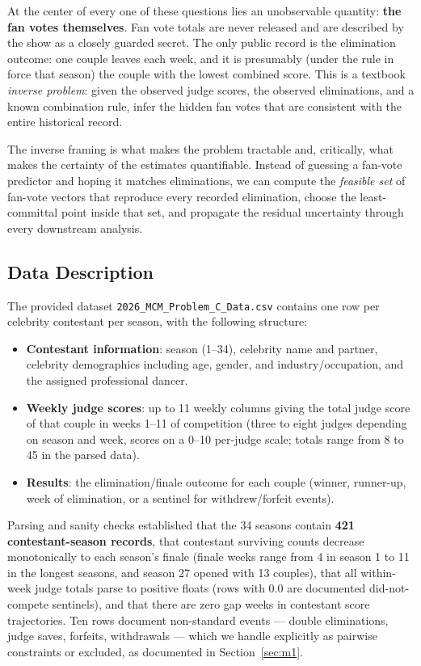 \documentclass[11pt]{article}
\begin{document}
At the center of every one of these questions lies an unobservable quantity: \textbf{the
fan votes themselves}. Fan vote totals are never released and are described by the show
as a closely guarded secret. The only public record is the elimination outcome: one
couple leaves each week, and it is presumably (under the rule in force that season) the
couple with the lowest combined score. This is a textbook \emph{inverse problem}: given
the observed judge scores, the observed eliminations, and a known combination rule,
infer the hidden fan votes that are consistent with the entire historical record.

The inverse framing is what makes the problem tractable and, critically, what makes the
certainty of the estimates quantifiable. Instead of guessing a fan-vote predictor and
hoping it matches eliminations, we can compute the \emph{feasible set} of fan-vote
vectors that reproduce every recorded elimination, choose the least-committal point
inside that set, and propagate the residual uncertainty through every downstream
analysis.

\subsection{Data Description}

The provided dataset \texttt{2026\_MCM\_Problem\_C\_Data.csv} contains one row per
celebrity contestant per season, with the following structure:

\begin{itemize}[itemsep=2pt]
  \item \textbf{Contestant information}: season (1--34), celebrity name and partner,
        celebrity demographics including age, gender, and industry/occupation, and the
        assigned professional dancer.
  \item \textbf{Weekly judge scores}: up to 11 weekly columns giving the total judge
        score of that couple in weeks 1--11 of competition (three to eight judges
        depending on season and week, scores on a 0--10 per-judge scale; totals range
        from 8 to 45 in the parsed data).
  \item \textbf{Results}: the elimination/finale outcome for each couple (winner,
        runner-up, week of elimination, or a sentinel for withdrew/forfeit events).
\end{itemize}

Parsing and sanity checks established that the 34 seasons contain \textbf{421
contestant-season records}, that contestant surviving counts decrease monotonically to
each season's finale (finale weeks range from 4 in season 1 to 11 in the longest seasons,
and season 27 opened with 13 couples), that all within-week judge totals parse to
positive floats (rows with 0.0 are documented did-not-compete sentinels), and that there
are zero gap weeks in contestant score trajectories. Ten rows document non-standard
events --- double eliminations, judge saves, forfeits, withdrawals --- which we handle
explicitly as pairwise constraints or excluded, as documented in Section~\ref{sec:m1}.
\end{document}
